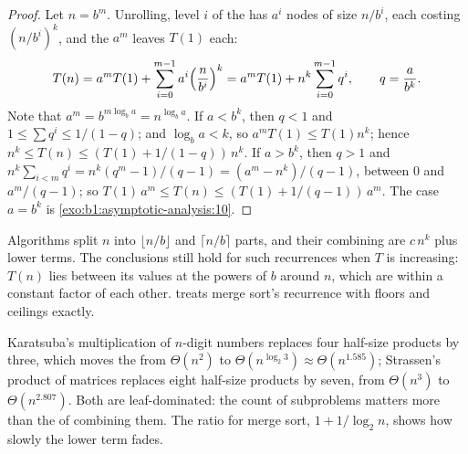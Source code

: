 \begin{proof}
Let $n = b^m$. Unrolling, level $i$ of the  has $a^i$ nodes of size $n/b^i$, each costing $(n/b^i)^k$,
and the $a^m$ leaves  $T(1)$ each:
\[
T(n) = a^m T(1) + \sum_{i=0}^{m-1} a^i \Bigl(\frac{n}{b^i}\Bigr)^k = a^m T(1) + n^k \sum_{i=0}^{m-1} q^i, \qquad q =
\frac{a}{b^k}.
\]
Note that $a^m = b^{m \log_b a} = n^{\log_b a}$. If $a < b^k$, then $q < 1$ and $1 \leq \sum q^i \leq 1/(1 - q)$; and
$\log_b a < k$, so $a^m T(1) \leq T(1) n^k$; hence $n^k \leq T(n) \leq (T(1) + 1/(1 - q))\, n^k$. If $a > b^k$, then
$q > 1$ and $n^k \sum_{i<m} q^i = n^k (q^m - 1)/(q - 1) = (a^m - n^k)/(q - 1)$, between 0 and $a^m/(q - 1)$; so $T(1)\,
a^m \leq T(n) \leq (T(1) + 1/(q - 1))\, a^m$. The case $a = b^k$ is \cref{exo:b1:asymptotic-analysis:10}.
\end{proof}

\begin{remark}
Algorithms split $n$ into $\lfloor n/b \rfloor$ and $\lceil n/b \rceil$ parts, and their combining  are $c\,n^k$
plus lower terms. The conclusions still hold for such recurrences when $T$ is increasing: $T(n)$ lies between its values at the
powers of $b$ around $n$, which are within a constant factor of each other.  treats
merge sort's recurrence with floors and ceilings exactly.
\end{remark}

\label{lst:b1:asymptotic-analysis:master}

\label{out:b1:asymptotic-analysis:master}

Karatsuba's multiplication of $n$-digit numbers replaces four half-size products by three, which moves the  from
$\Theta(n^2)$ to $\Theta(n^{\log_2 3}) \approx \Theta(n^{1.585})$; Strassen's product of matrices replaces eight
half-size products by seven, from $\Theta(n^3)$ to $\Theta(n^{2.807})$. Both are leaf-dominated: the count of
subproblems matters more than the  of combining them. The ratio for merge sort, $1 + 1/\log_2 n$, shows how slowly
the lower term fades.

